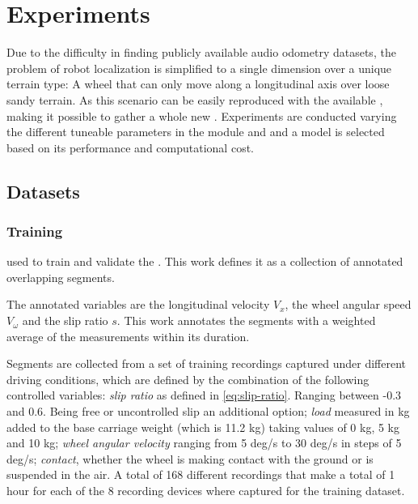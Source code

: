 \section{Experiments} \label{sec:experiments}

Due to the difficulty in finding publicly available audio odometry datasets,
the problem of robot localization is simplified to a single dimension over a
unique terrain type: A wheel that can only move along a longitudinal axis over
loose sandy terrain. As this scenario can be easily reproduced with the
available , making it possible to gather a
whole new . Experiments are conducted varying the
different tuneable parameters in the  module
and  and a model is selected based on its
performance and computational cost.



\subsection{Datasets} \label{subsec:datasets}

\subsubsection{Training} \label{subsubsec:training-dataset}
used to train and validate the . This work
defines it as a collection of annotated overlapping segments.

The annotated variables are the longitudinal velocity $V_x$, the wheel angular
speed $V_\omega$ and the slip ratio $s$. This work annotates the segments with
a weighted average of the measurements within its duration.

Segments are collected from a set of training recordings captured under
different driving conditions, which are defined by the combination of the
following controlled variables: \emph{slip ratio} as defined in
\cref{eq:slip-ratio}. Ranging between -0.3 and 0.6. Being free or uncontrolled
slip an additional option; \emph{load} measured in kg added to the base
carriage weight (which is 11.2 kg) taking values of 0 kg, 5 kg and 10 kg;
\emph{wheel angular velocity} ranging from 5 deg/s to 30 deg/s in steps of 5
deg/s; \emph{contact}, whether the wheel is making contact with the ground or
is suspended in the air. A total of 168 different recordings that make a total
of 1 hour for each of the 8 recording devices where captured for the training
dataset.

